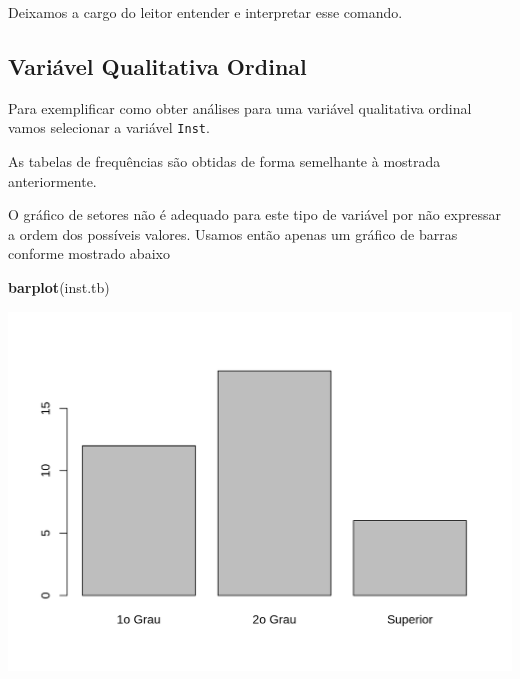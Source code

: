 \documentclass[10pt,a4paper]{book}
\newenvironment{Shaded}{\begin{snugshade}}{\end{snugshade}}
\newcommand{\KeywordTok}[1]{\textcolor[rgb]{0.13,0.29,0.53}{\textbf{#1}}}
\newcommand{\DecValTok}[1]{\textcolor[rgb]{0.00,0.00,0.81}{#1}}
\newcommand{\FloatTok}[1]{\textcolor[rgb]{0.00,0.00,0.81}{#1}}
\newcommand{\StringTok}[1]{\textcolor[rgb]{0.31,0.60,0.02}{#1}}
\newcommand{\OperatorTok}[1]{\textcolor[rgb]{0.81,0.36,0.00}{\textbf{#1}}}
\newcommand{\NormalTok}[1]{#1}
\begin{document}
Deixamos a cargo do leitor entender e interpretar esse comando.

\subsection{Variável Qualitativa
Ordinal}\label{variuxe1vel-qualitativa-ordinal}

Para exemplificar como obter análises para uma variável qualitativa
ordinal vamos selecionar a variável \texttt{Inst}.

As tabelas de frequências são obtidas de forma semelhante à mostrada
anteriormente.

\begin{Shaded}
\end{Shaded}

O gráfico de setores não é adequado para este tipo de variável por não
expressar a ordem dos possíveis valores. Usamos então apenas um gráfico
de barras conforme mostrado abaixo

\begin{Shaded}
\begin{Highlighting}[]
\KeywordTok{barplot}\NormalTok{(inst.tb)}
\end{Highlighting}
\end{Shaded}

\begin{center}\includegraphics{figures/unnamed-chunk-296-1} \end{center}
\end{document}
